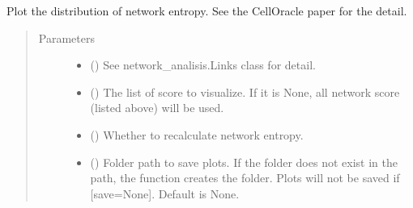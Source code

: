 \documentclass[letterpaper,10pt,english]{sphinxmanual}
\begin{document}
\begin{fulllineitems}
\begin{fulllineitems}
\begin{quote}
\begin{description}
\begin{itemize}
\end{itemize}

\end{description}\end{quote}

\end{fulllineitems}


\begin{fulllineitems}
\label{\detokenize{modules/celloracle:celloracle.Links.plot_network_entropy_distributions}}
Plot the distribution of network entropy.
See the CellOracle paper for the detail.
\begin{quote}\begin{description}
\item[{Parameters}] \leavevmode\begin{itemize}
\item {} 
 () \textendash{} See network\_analisis.Links class for detail.

\item {} 
 () \textendash{} The list of score to visualize. If it is None, all network score (listed above) will be used.

\item {} 
 () \textendash{} Whether to recalculate network entropy.

\item {} 
 () \textendash{} Folder path to save plots. If the folder does not exist in the path, the function creates the folder.
Plots will not be saved if {[}save=None{]}. Default is None.

\end{itemize}

\end{description}\end{quote}

\end{fulllineitems}


\end{fulllineitems}
\end{document}

